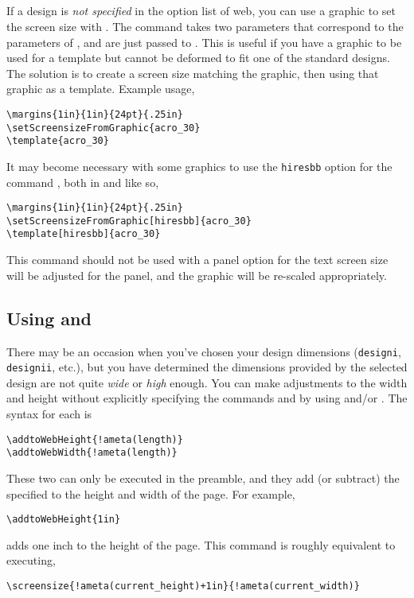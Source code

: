 \documentclass{article}
\let\tops\texorpdfstring
\def\Web{\textsf{web}}
\edef\amtIndent{\the\parindent}
\def\CMD#1{\textbackslash#1}
\begin{document}
{\subsection{\tops{\protect{}}{\CMD{setScreensizeFromGraphic}}}\label{setScreensizeFromGraphic}

If a design is \emph{not specified} in the option list of \Web, you
can use a graphic to set the screen size with
. The command takes two parameters
that correspond to the parameters of , and are
just passed to . This is useful if you have a
graphic to be used for a template but cannot be deformed to fit one
of the standard designs. The solution is to create a screen size
matching the graphic, then using that graphic as a template. Example
usage,
\begin{Verbatim}[xleftmargin=\amtIndent]
\margins{1in}{1in}{24pt}{.25in}
\setScreensizeFromGraphic{acro_30}
\template{acro_30}
\end{Verbatim}
It may become necessary with some graphics to use the
\texttt{hiresbb} option for the command , both in
 and  like so,
\begin{Verbatim}[xleftmargin=\amtIndent]
\margins{1in}{1in}{24pt}{.25in}
\setScreensizeFromGraphic[hiresbb]{acro_30}
\template[hiresbb]{acro_30}
\end{Verbatim}
\newtopic This command should not be used with a panel option for the text screen
size will be adjusted for the panel, and the graphic will be
re-scaled appropriately.

\subsection{Using \tops{\protect{} and \protect{}}
{\CMD{addtoWebHeight} and \CMD{addtoWebWidth}}}

There may be an occasion when you've chosen your design dimensions
(\texttt{designi}, \texttt{designii}, etc.), but you have determined the
dimensions provided by the selected design are not quite \emph{wide} or \emph{high} enough.
You can make adjustments to the width and height without explicitly specifying
the commands  and  by using  and/or
. The syntax for each is
\begin{Verbatim}[xleftmargin=\amtIndent,commandchars=!()]
\addtoWebHeight{!ameta(length)}
\addtoWebWidth{!ameta(length)}
\end{Verbatim}
These two can only be executed in the preamble, and they add (or subtract)
the specified  to the height and width of the page. For example,
\begin{Verbatim}[xleftmargin=\amtIndent]
\addtoWebHeight{1in}
\end{Verbatim}
adds one inch to the height of the page. This
command is roughly equivalent to executing,
\begin{Verbatim}[xleftmargin=\amtIndent,commandchars=!()]
\screensize{!ameta(current_height)+1in}{!ameta(current_width)}
\end{Verbatim}


}
\end{document}
